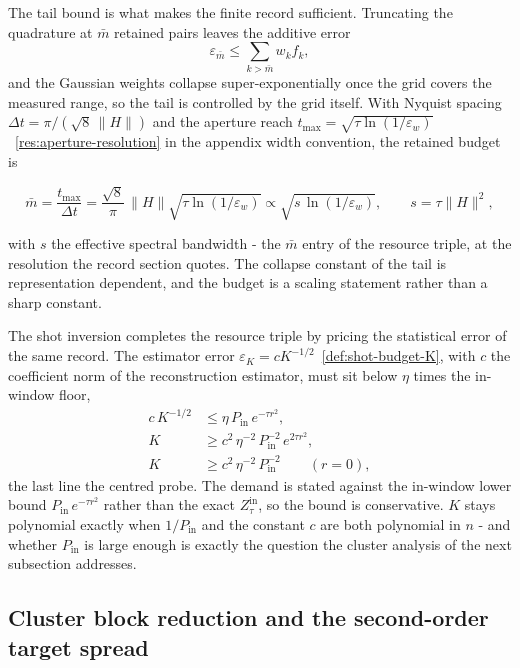 The tail bound is what makes the finite record sufficient. Truncating the quadrature at $\bar m$ retained pairs leaves the additive error
\begin{equation*}
\varepsilon_{\bar m} \le \sum_{k > \bar m} w_k f_k ,
\end{equation*}
and the Gaussian weights collapse super-exponentially once the grid covers the measured range, so the tail is controlled by the grid itself. With Nyquist spacing $\Delta t = \pi / (\sqrt{8} \, \|H\|)$ and the aperture reach $t_{\max} = \sqrt{\tau \ln(1/\varepsilon_w)}$~\eqref{res:aperture-resolution} in the appendix width convention, the retained budget is
\begin{widetext}
\begin{equation*}
\bar m = \frac{t_{\max}}{\Delta t}
= \frac{\sqrt{8}}{\pi} \, \|H\| \sqrt{\tau \ln(1/\varepsilon_w)}
\propto \sqrt{s \, \ln(1/\varepsilon_w)} , \qquad s = \tau \|H\|^2 ,
\end{equation*}
\end{widetext}
with $s$ the effective spectral bandwidth - the $\bar m$ entry of the resource triple, at the resolution the record section quotes. The collapse constant of the tail is representation dependent, and the budget is a scaling statement rather than a sharp constant.

The shot inversion completes the resource triple by pricing the statistical error of the same record. The estimator error $\varepsilon_K = c K^{-1/2}$~\eqref{def:shot-budget-K}, with $c$ the coefficient norm of the reconstruction estimator, must sit below $\eta$ times the in-window floor,
\begin{align*}
c \, K^{-1/2} &\le \eta \, P_{\mathrm{in}} \, e^{-\tau r^2} , \\
K &\ge c^2 \, \eta^{-2} \, P_{\mathrm{in}}^{-2} \, e^{2 \tau r^2} , \\
K &\ge c^2 \, \eta^{-2} \, P_{\mathrm{in}}^{-2} \qquad (r = 0) ,
\end{align*}
the last line the centred probe. The demand is stated against the in-window lower bound $P_{\mathrm{in}} \, e^{-\tau r^2}$ rather than the exact $Z_\tau^{\mathrm{in}}$, so the bound is conservative. $K$ stays polynomial exactly when $1/P_{\mathrm{in}}$ and the constant $c$ are both polynomial in $n$ - and whether $P_{\mathrm{in}}$ is large enough is exactly the question the cluster analysis of the next subsection addresses.

\subsection*{Cluster block reduction and the second-order target spread}

